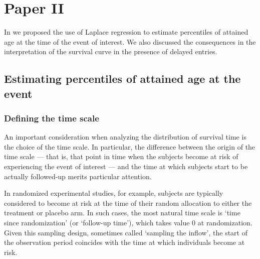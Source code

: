 %

\section{Paper II}

In  we proposed the use of Laplace regression to estimate percentiles of attained age at the time of the event of interest. We also discussed the consequences in the interpretation of the survival curve in the presence of delayed entries.  %

\subsection{Estimating percentiles of attained age at the event}

\subsubsection{Defining the time scale}
An important consideration when analyzing the distribution of survival time is the choice of the time scale. In particular, the difference between the origin of the time scale --- that is, that point in time when the subjects become at risk of experiencing the event of interest --- and the time at which subjects start to be actually followed-up merits particular attention. 

In randomized experimental studies, for example, subjects are typically considered to become at risk at the time of their random allocation to either the treatment or placebo arm. In such cases, the most natural time scale is `time since randomization' (or `follow-up time'), which takes value 0 at randomization. Given this sampling design, sometimes called `sampling the inflow', the start of the observation period coincides with the time at which individuals become at risk.

